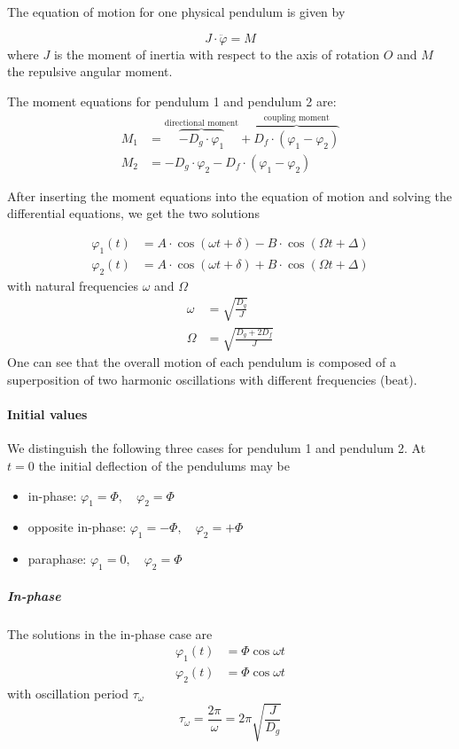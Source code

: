 \documentclass{scrreprt}
\renewcommand{\phi}{\varphi}
\begin{document}
The equation of motion for one physical pendulum is given by

\begin{equation}
J\cdot \ddot{\phi} = M
\end{equation}
where $J$ is the moment of inertia with respect to the axis of rotation $O$ and $M$ the repulsive angular moment.

The moment equations for pendulum 1 and pendulum 2 are:
\begin{align}
M_1 &= \overbrace{-D_g\cdot \phi_1}^{\text{directional moment}} + \overbrace{D_f \cdot (\phi_1 - \phi_2)}^{\text{coupling moment}}  \\
M_2 &= -D_g\cdot \phi_2 - D_f \cdot (\phi_1 - \phi_2)
\end{align}

After inserting the moment equations into the equation of motion and solving the differential equations, we get the two solutions

\begin{align}
\phi_1(t) &= A \cdot \cos{(\omega t + \delta)} - B \cdot \cos{(\Omega t + \Delta)}\\
\phi_2(t) &= A \cdot \cos{(\omega t + \delta)} + B \cdot \cos{(\Omega t + \Delta)}
\end{align}
with natural frequencies $\omega$ and $\Omega$
\begin{align}
\omega &= \sqrt{\frac{D_g}{J}}\\
\Omega &= \sqrt{\frac{D_g+2 D_f}{J}}
\end{align}
One can see that the overall motion of each pendulum is composed of a superposition of two harmonic oscillations with different frequencies (beat).

\paragraph{Initial values}
We distinguish the following three cases for pendulum 1 and pendulum 2. At $t=0$ the initial deflection of the pendulums may be
\begin{itemize}
\item in-phase: $\phi_1 = \Phi, \quad \phi_2 = \Phi$
\item opposite in-phase: $\phi_1 = -\Phi, \quad \phi_2 = +\Phi$
\item paraphase: $\phi_1 = 0, \quad \phi_2 = \Phi$
\end{itemize}

\subparagraph*{In-phase}
The solutions in the in-phase case are
\begin{align}
\phi_1(t) &= \Phi \cos{\omega t}\\
\phi_2(t) &= \Phi \cos{\omega t}
\end{align}
with oscillation period $\tau_{\omega}$
\begin{equation}
\tau_{\omega} = \frac{2 \pi}{\omega} = 2 \pi \sqrt{\frac{J}{D_g}}
\end{equation}
\end{document}
